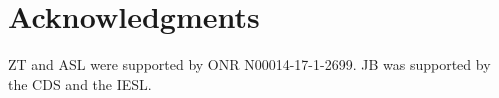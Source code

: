 \section{Acknowledgments}
ZT and ASL were supported by ONR N00014-17-1-2699.  JB was supported by the CDS and the IESL.